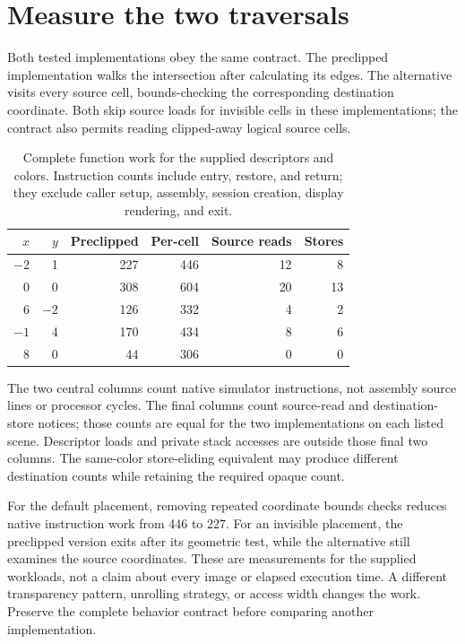 \section{Measure the two traversals}\label{blit-measurement}
Both tested implementations obey the same contract. The preclipped implementation
walks the intersection after calculating its edges. The alternative visits every
source cell, bounds-checking the corresponding destination coordinate. Both skip
source loads for invisible cells in these implementations; the contract also
permits reading clipped-away logical source cells.

\begin{table}[htbp]
  \centering
  \caption{Complete function work for the supplied descriptors and colors. Instruction counts include entry, restore, and return; they exclude caller setup, assembly, session creation, display rendering, and exit.}
  \begin{tabular}{rrrrrr}
    \toprule
    $x$  & $y$  & Preclipped & Per-cell & Source reads & Stores \\
    \midrule
    $-2$ & 1    & 227        & 446      & 12           & 8      \\
    0    & 0    & 308        & 604      & 20           & 13     \\
    6    & $-2$ & 126        & 332      & 4            & 2      \\
    $-1$ & 4    & 170        & 434      & 8            & 6      \\
    8    & 0    & 44         & 306      & 0            & 0      \\
    \bottomrule
  \end{tabular}
\end{table}
The two central columns count native simulator instructions, not assembly source
lines or processor cycles. The final columns count source-read and destination-store
notices; those counts are equal for the two implementations on each listed scene.
Descriptor loads and private stack accesses are outside those final two columns.
The same-color store-eliding equivalent may produce different destination counts
while retaining the required opaque count.

For the default placement, removing repeated coordinate bounds checks reduces
native instruction work from 446 to 227. For an invisible placement, the preclipped
version exits after its geometric test, while the alternative still examines the
source coordinates. These are measurements for the supplied workloads, not a claim
about every image or elapsed execution time. A different transparency pattern,
unrolling strategy, or access width changes the work. Preserve the complete behavior
contract before comparing another implementation.
